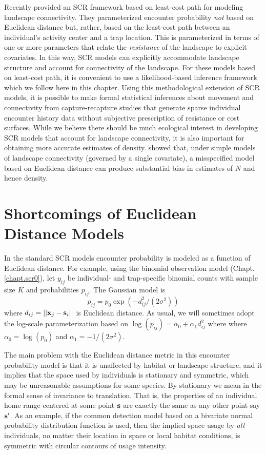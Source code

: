 Recently \citet{royle_etal:2012ecol} provided an SCR
framework based on least-cost path for modeling landscape
connectivity. They parameterized encounter
probability {\it not} based on Euclidean distance but, rather, based
on the least-cost path between an individual's activity center and a
trap location. This is parameterized in terms of one or more
parameters that relate the {\it resistance} of the landscape to
explicit covariates.  In this way, SCR models can explicitly accommodate
landscape structure and account for connectivity of the landscape.
For these models based on least-cost path, it is convenient to use a
likelihood-based inference framework which we follow here in this
chapter.
Using this
methodological extension of SCR models, it is possible to make formal
statistical inferences about movement and connectivity from
capture-recapture studies that generate sparse individual encounter
history data without subjective prescription of resistance or cost
surfaces. %
While we believe there
should be much ecological interest in developing SCR models that
account for landscape connectivity, it is also important for obtaining
more accurate estimates of density.  \citet{royle_etal:2012ecol}
showed that, under simple models of landscape connectivity (governed
by a single covariate), a misspecified model based on Euclidean
distance can produce substantial bias in estimates of $N$ and hence
density.

\section{Shortcomings of Euclidean Distance Models}

In the standard SCR models encounter probability is modeled as a
function of Euclidean distance. For example, using the binomial
observation model (Chapt. \ref{chapt.scr0}), let $y_{ij}$ be
individual- and trap-specific binomial counts with sample size $K$ and
probabilities $p_{ij}$. The Gaussian model is
\[
p_{ij} = p_{0} \exp(-  d_{ij}^2 /(2\sigma^{2}) )
\]
where $d_{ij} = ||{\bf x}_{j} - {\bf s}_{i}||$ is Euclidean
distance. As usual, we will sometimes adopt the log-scale
parameterization based on $\log(p_{ij})= \alpha_{0} + \alpha_{1}
d_{ij}^{2}$ where where $\alpha_{0} = \log(p_{0})$ and $\alpha_{1} =
-1/(2\sigma^2)$.

The main problem with the Euclidean distance metric in this encounter
probability model is that it is unaffected by habitat or landscape
structure, and it implies that the space used by individuals is
stationary and symmetric, which may be unreasonable assumptions for
some species. By stationary %
we mean in the formal sense of
invariance to translation. That is, the properties of an individual
home range centered at some point ${\bf s}$ are exactly the same as
any other point say ${\bf s}'$.  As an example, if the common
detection model based on a bivariate normal probability distribution
function is used, then the implied space usage by {\it all}
individuals, no matter their location in space or local habitat
conditions, is symmetric with circular contours of usage intensity.


